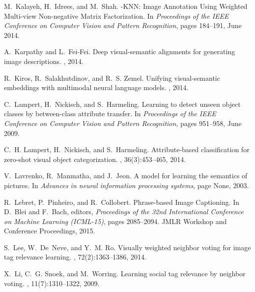 \documentclass[10pt,twocolumn,letterpaper]{article}
\begin{document}
\begin{thebibliography}{10}
M.~Kalayeh, H.~Idrees, and M.~Shah.
-{KNN}: {Image} {Annotation} {Using} {Weighted} {Multi}-view
  {Non}-negative {Matrix} {Factorization}.
\newblock In {\em Proceedings of the {IEEE} {Conference} on {Computer} {Vision}
  and {Pattern} {Recognition}}, pages 184--191, June 2014.

A.~Karpathy and L.~Fei-Fei.
\newblock Deep visual-semantic alignments for generating image descriptions.
, 2014.

R.~Kiros, R.~Salakhutdinov, and R.~S. Zemel.
\newblock Unifying visual-semantic embeddings with multimodal neural language
  models.
, 2014.

C.~Lampert, H.~Nickisch, and S.~Harmeling.
\newblock Learning to detect unseen object classes by between-class attribute
  transfer.
\newblock In {\em Proceedings of the {IEEE} {Conference} on {Computer} {Vision}
  and {Pattern} {Recognition}}, pages 951--958, June 2009.

C.~H. Lampert, H.~Nickisch, and S.~Harmeling.
\newblock Attribute-based classification for zero-shot visual object
  categorization.
, 36(3):453--465, 2014.

V.~Lavrenko, R.~Manmatha, and J.~Jeon.
\newblock A model for learning the semantics of pictures.
\newblock In {\em Advances in neural information processing systems}, page
  None, 2003.

R.~Lebret, P.~Pinheiro, and R.~Collobert.
\newblock Phrase-based {Image} {Captioning}.
\newblock In D.~Blei and F.~Bach, editors, {\em Proceedings of the 32nd
  {International} {Conference} on {Machine} {Learning} ({ICML}-15)}, pages
  2085--2094. JMLR Workshop and Conference Proceedings, 2015.

S.~Lee, W.~De~Neve, and Y.~M. Ro.
\newblock Visually weighted neighbor voting for image tag relevance learning.
, 72(2):1363--1386, 2014.

X.~Li, C.~G. Snoek, and M.~Worring.
\newblock Learning social tag relevance by neighbor voting.
, 11(7):1310--1322, 2009.


\end{thebibliography}
\end{document}

